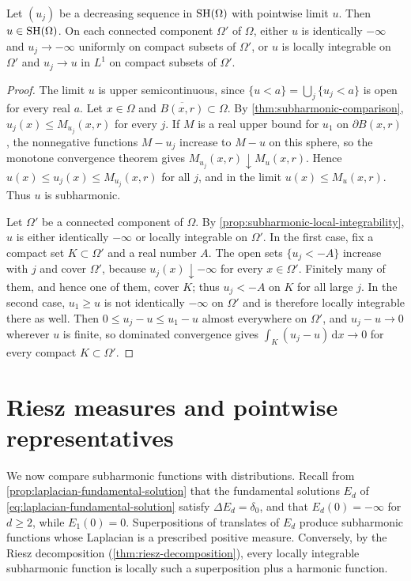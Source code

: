 \begin{theorem}\label{thm:subharmonic-decreasing}
Let $(u_j)$ be a decreasing sequence in $\mathrm{SH}(\Omega)$ with pointwise limit $u$. Then $u\in\mathrm{SH}(\Omega)$. On each connected component $\Omega'$ of $\Omega$, either $u$ is identically $-\infty$ and $u_j\to-\infty$ uniformly on compact subsets of $\Omega'$, or $u$ is locally integrable on $\Omega'$ and $u_j\to u$ in $L^1$ on compact subsets of $\Omega'$.
\end{theorem}
\begin{proof}
The limit $u$ is upper semicontinuous, since $\{u<a\}=\bigcup_j\{u_j<a\}$ is open for every real $a$. Let $x\in\Omega$ and $\overline{B(x,r)}\subset\Omega$. By \cref{thm:subharmonic-comparison}, $u_j(x)\leq M_{u_j}(x,r)$ for every $j$. If $M$ is a real upper bound for $u_1$ on $\partial B(x,r)$, the nonnegative functions $M-u_j$ increase to $M-u$ on this sphere, so the monotone convergence theorem gives $M_{u_j}(x,r)\downarrow M_u(x,r)$. Hence $u(x)\leq u_j(x)\leq M_{u_j}(x,r)$ for all $j$, and in the limit $u(x)\leq M_u(x,r)$. Thus $u$ is subharmonic.

Let $\Omega'$ be a connected component of $\Omega$. By \cref{prop:subharmonic-local-integrability}, $u$ is either identically $-\infty$ or locally integrable on $\Omega'$. In the first case, fix a compact set $K\subset\Omega'$ and a real number $A$. The open sets $\{u_j<-A\}$ increase with $j$ and cover $\Omega'$, because $u_j(x)\downarrow-\infty$ for every $x\in\Omega'$. Finitely many of them, and hence one of them, cover $K$; thus $u_j<-A$ on $K$ for all large $j$. In the second case, $u_1\geq u$ is not identically $-\infty$ on $\Omega'$ and is therefore locally integrable there as well. Then $0\leq u_j-u\leq u_1-u$ almost everywhere on $\Omega'$, and $u_j-u\to0$ wherever $u$ is finite, so dominated convergence gives $\int_K(u_j-u)\,\mathrm d x\to0$ for every compact $K\subset\Omega'$.
\end{proof}

\section{Riesz measures and pointwise representatives}
\label{sec:riesz-representative}
We now compare subharmonic functions with distributions. Recall from \cref{prop:laplacian-fundamental-solution} that the fundamental solutions $E_d$ of \eqref{eq:laplacian-fundamental-solution} satisfy $\Delta E_d=\delta_0$, and that $E_d(0)=-\infty$ for $d\geq2$, while $E_1(0)=0$. Superpositions of translates of $E_d$ produce subharmonic functions whose Laplacian is a prescribed positive measure. Conversely, by the Riesz decomposition (\cref{thm:riesz-decomposition}), every locally integrable subharmonic function is locally such a superposition plus a harmonic function.

